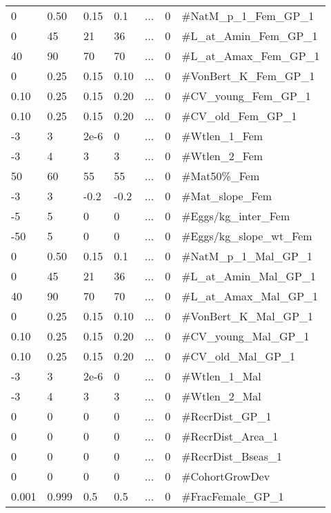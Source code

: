 \begin{center}
\begin{longtable}{p{1.1cm} p{1.1cm} p{1.1cm}  p{1.7cm}  p{2cm}  p{1.6cm}  p{5cm}  }
		0    & 0.50 & 0.15 & 0.1  & ... & 0 & \#NatM\_p\_1\_Fem\_GP\_1\\
		0    & 45   & 21   & 36   & ... & 0 & \#L\_at\_Amin\_Fem\_GP\_1 \\
		40   & 90   & 70   & 70   & ... & 0 & \#L\_at\_Amax\_Fem\_GP\_1 \\
		0    & 0.25 & 0.15 & 0.10 & ... & 0 & \#VonBert\_K\_Fem\_GP\_1 \\
		0.10 & 0.25 & 0.15 & 0.20 & ... & 0 & \#CV\_young\_Fem\_GP\_1 \\
		0.10 & 0.25 & 0.15 & 0.20 & ... & 0 & \#CV\_old\_Fem\_GP\_1 \\
		-3   & 3    & 2e-6 & 0    & ... & 0 & \#Wtlen\_1\_Fem \\
		-3   & 4    & 3    & 3    & ... & 0 & \#Wtlen\_2\_Fem \\
		50   & 60   & 55   & 55   & ... & 0 & \#Mat50\%\_Fem  \\
		-3   & 3    & -0.2 & -0.2 & ... & 0 & \#Mat\_slope\_Fem \\
		-5   & 5    & 0    & 0    & ... & 0 & \#Eggs/kg\_inter\_Fem \\
		-50  & 5    & 0    & 0    & ... & 0 & \#Eggs/kg\_slope\_wt\_Fem \\
		0    & 0.50 & 0.15 & 0.1  & ... & 0 & \#NatM\_p\_1\_Mal\_GP\_1\\
		0    & 45   & 21   & 36   & ... & 0 & \#L\_at\_Amin\_Mal\_GP\_1 \\
		40   & 90   & 70   & 70   & ... & 0 & \#L\_at\_Amax\_Mal\_GP\_1 \\
		0    & 0.25 & 0.15 & 0.10 & ... & 0 & \#VonBert\_K\_Mal\_GP\_1 \\
		0.10 & 0.25 & 0.15 & 0.20 & ... & 0 & \#CV\_young\_Mal\_GP\_1 \\
		0.10 & 0.25 & 0.15 & 0.20 & ... & 0 & \#CV\_old\_Mal\_GP\_1 \\
		-3   & 3    & 2e-6 & 0    & ... & 0 & \#Wtlen\_1\_Mal \\
		-3   & 4    & 3    & 3    & ... & 0 & \#Wtlen\_2\_Mal \\
		 0   & 0    & 0    & 0    & ... & 0 & \#RecrDist\_GP\_1 \\
		 0   & 0    & 0    & 0    & ... & 0 & \#RecrDist\_Area\_1 \\
		 0   & 0    & 0    & 0    & ... & 0 & \#RecrDist\_Bseas\_1 \\
		 0   & 0    & 0    & 0    & ... & 0 & \#CohortGrowDev \\
		0.001 & 0.999 & 0.5 & 0.5 & ... & 0 & \#FracFemale\_GP\_1 \\
		\hline
	\end{longtable}
\end{center}

